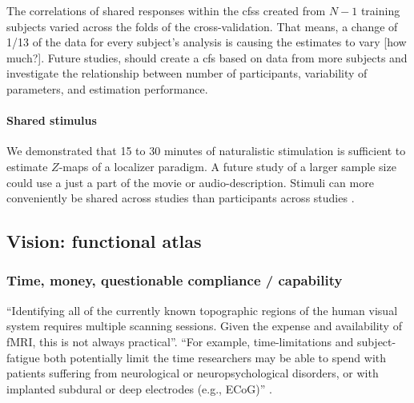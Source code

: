 

The correlations of shared responses within the \acp{cfs} created from $N-1$
training subjects varied across the folds of the cross-validation.
That means, a change of 1/13 of the data for every subject's analysis is causing
the estimates to vary [how much?].
Future studies, should create a \ac{cfs} based on data from more subjects and
investigate the relationship between number of participants, variability of
parameters, and estimation performance.


\paragraph{Shared stimulus}

%
We demonstrated that 15 to 30 minutes of naturalistic stimulation is sufficient
to estimate $Z$-maps of a localizer paradigm.
%
A future study of a larger sample size could use a just a part of the movie or
audio-description.
%
Stimuli can more conveniently be shared across studies than participants across
studies \citep[cf.][an extension of the \ac{srm} for shared subjects
across datasets]{zhang2018transfer}.





\subsection{Vision: functional atlas}





\subsubsection{Time, money, questionable compliance / capability}

``Identifying all of the currently known topographic regions of the human visual
system requires multiple scanning sessions.
%
Given the expense and availability of fMRI, this is not always practical''.
%
``For example, time-limitations and subject-fatigue both potentially limit the
time researchers may be able to spend with patients suffering from neurological
or neuropsychological disorders, or with implanted subdural or deep electrodes
(e.g., ECoG)'' \citep{wang2015probabilistic}.

